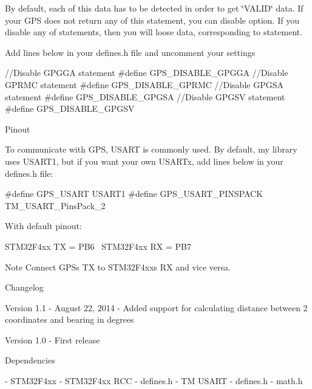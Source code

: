 By default, each of this data has to be detected in order to get \char`\"{}\+V\+A\+L\+I\+D\char`\"{} data. If your G\+P\+S does not return any of this statement, you can disable option. If you disable any of statements, then you will loose data, corresponding to statement.

Add lines below in your defines.\+h file and uncomment your settings \begin{DoxyVerb}//Disable GPGGA statement
#define GPS_DISABLE_GPGGA
//Disable GPRMC statement
#define GPS_DISABLE_GPRMC 
//Disable GPGSA statement
#define GPS_DISABLE_GPGSA
//Disable GPGSV statement
#define GPS_DISABLE_GPGSV
\end{DoxyVerb}
 \begin{DoxyParagraph}{Pinout}

\end{DoxyParagraph}
To communicate with G\+P\+S, U\+S\+A\+R\+T is commonly used. By default, my library uses U\+S\+A\+R\+T1, but if you want your own U\+S\+A\+R\+Tx, add lines below in your defines.\+h file\+:

\begin{DoxyVerb}#define GPS_USART               USART1
#define GPS_USART_PINSPACK      TM_USART_PinsPack_2
\end{DoxyVerb}


With default pinout\+:

S\+T\+M32\+F4xx T\+X = P\+B6~\newline
 S\+T\+M32\+F4xx R\+X = P\+B7

\begin{DoxyNote}{Note}
Connect G\+P\+S\textquotesingle{}s T\+X to S\+T\+M32\+F4xx\textquotesingle{}s R\+X and vice versa.
\end{DoxyNote}
\begin{DoxyParagraph}{Changelog}

\end{DoxyParagraph}
\begin{DoxyVerb} Version 1.1
   - August 22, 2014
   - Added support for calculating distance between 2 coordinates and bearing in degrees

  Version 1.0
   - First release
\end{DoxyVerb}


\begin{DoxyParagraph}{Dependencies}

\end{DoxyParagraph}
\begin{DoxyVerb} - STM32F4xx
 - STM32F4xx RCC
 - defines.h
 - TM USART
 - defines.h
 - math.h
\end{DoxyVerb}
 
